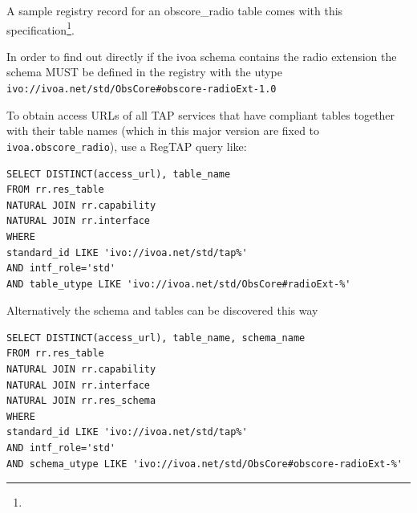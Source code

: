 \documentclass[11pt,a4paper]{ivoa}
\begin{document}
A sample registry record for an obscore\_radio table comes with this
specification\footnote{}.

In order to find out directly if the ivoa schema contains the radio extension
the schema MUST be defined in the registry with the utype
\hbox{\nolinkurl{ivo://ivoa.net/std/ObsCore#obscore-radioExt-1.0}}

To obtain access URLs of all TAP services that have compliant tables
together with their table names (which in this major version are fixed
to \verb|ivoa.obscore_radio|), use a RegTAP \citep{2019ivoa.spec.1011D}
query like:

\begin{lstlisting}
SELECT DISTINCT(access_url), table_name
FROM rr.res_table
NATURAL JOIN rr.capability
NATURAL JOIN rr.interface
WHERE
standard_id LIKE 'ivo://ivoa.net/std/tap%'
AND intf_role='std'
AND table_utype LIKE 'ivo://ivoa.net/std/ObsCore#radioExt-%'
\end{lstlisting}

Alternatively the schema and tables can be discovered this way

\begin{lstlisting}
SELECT DISTINCT(access_url), table_name, schema_name
FROM rr.res_table
NATURAL JOIN rr.capability
NATURAL JOIN rr.interface
NATURAL JOIN rr.res_schema
WHERE 
standard_id LIKE 'ivo://ivoa.net/std/tap%'
AND intf_role='std'
AND schema_utype LIKE 'ivo://ivoa.net/std/ObsCore#obscore-radioExt-%'
\end{lstlisting}

\appendix





\end{document}
